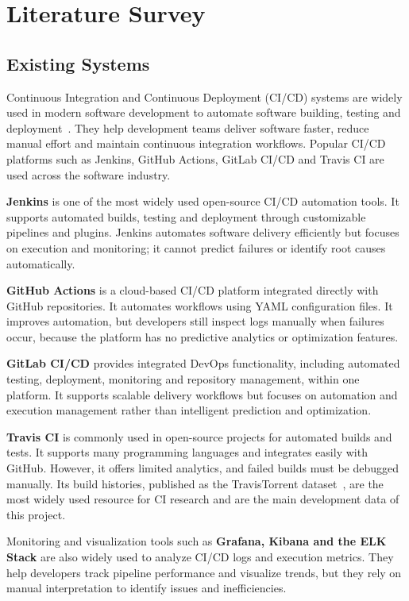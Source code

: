 \chapter{Literature Survey}
\label{ch:lit}

\section{Existing Systems}
\label{sec:existing}
Continuous Integration and Continuous Deployment (CI/CD) systems are widely used in modern software development to automate software building, testing and deployment~\cite{hilton2016usage}. They help development teams deliver software faster, reduce manual effort and maintain continuous integration workflows. Popular CI/CD platforms such as Jenkins, GitHub Actions, GitLab CI/CD and Travis CI are used across the software industry.

\textbf{Jenkins} is one of the most widely used open-source CI/CD automation tools. It supports automated builds, testing and deployment through customizable pipelines and plugins. Jenkins automates software delivery efficiently but focuses on execution and monitoring; it cannot predict failures or identify root causes automatically.

\textbf{GitHub Actions} is a cloud-based CI/CD platform integrated directly with GitHub repositories. It automates workflows using YAML configuration files. It improves automation, but developers still inspect logs manually when failures occur, because the platform has no predictive analytics or optimization features.

\textbf{GitLab CI/CD} provides integrated DevOps functionality, including automated testing, deployment, monitoring and repository management, within one platform. It supports scalable delivery workflows but focuses on automation and execution management rather than intelligent prediction and optimization.

\textbf{Travis CI} is commonly used in open-source projects for automated builds and tests. It supports many programming languages and integrates easily with GitHub. However, it offers limited analytics, and failed builds must be debugged manually. Its build histories, published as the TravisTorrent dataset~\cite{beller2017travistorrent}, are the most widely used resource for CI research and are the main development data of this project.

Monitoring and visualization tools such as \textbf{Grafana, Kibana and the ELK Stack} are also widely used to analyze CI/CD logs and execution metrics. They help developers track pipeline performance and visualize trends, but they rely on manual interpretation to identify issues and inefficiencies.

